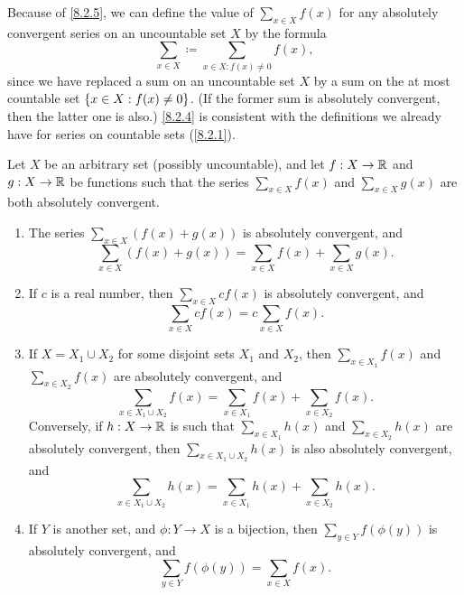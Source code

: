 \begin{note}
	Because of \cref{8.2.5}, we can define the value of \(\sum_{x \in X} f(x)\) for any absolutely convergent series on an uncountable set \(X\) by the formula
	\[
		\sum_{x \in X} \coloneqq \sum_{x \in X : f(x) \neq 0} f(x),
	\]
	since we have replaced a sum on an uncountable set \(X\) by a sum on the at most countable set \(\left\lbrace x \in X : f(x) \neq 0\right\rbrace\).
	(If the former sum is absolutely convergent, then the latter one is also.)
	\cref{8.2.4} is consistent with the definitions we already have for series on countable sets (\cref{8.2.1}).
\end{note}

\begin{prop}\label{8.2.6}
	Let \(X\) be an arbitrary set (possibly uncountable), and let \(f : X \to \mathbb{R}\) and \(g : X \to \mathbb{R}\) be functions such that the series \(\sum_{x \in X} f(x)\) and \(\sum_{x \in X} g(x)\) are both absolutely convergent.
	\begin{enumerate}
		\item The series \(\sum_{x \in X} (f(x) + g(x))\) is absolutely convergent, and
		      \[
			      \sum_{x \in X} (f(x) + g(x)) = \sum_{x \in X} f(x) + \sum_{x \in X} g(x).
		      \]
		\item If \(c\) is a real number, then \(\sum_{x \in X} cf(x)\) is absolutely convergent, and
		      \[
			      \sum_{x \in X} cf(x) = c \sum_{x \in X} f(x).
		      \]
		\item If \(X = X_1 \cup X_2\) for some disjoint sets \(X_1\) and \(X_2\), then \(\sum_{x \in X_1} f(x)\) and \\
		      \(\sum_{x \in X_2} f(x)\) are absolutely convergent, and
		      \[
			      \sum_{x \in X_1 \cup X_2} f(x) = \sum_{x \in X_1} f(x) + \sum_{x \in X_2} f(x).
		      \]
		      Conversely, if \(h : X \to \mathbb{R}\) is such that \(\sum_{x \in X_1} h(x)\) and \(\sum_{x \in X_2} h(x)\) are absolutely convergent, then \(\sum_{x \in X_1 \cup X_2} h(x)\) is also absolutely convergent, and
		      \[
			      \sum_{x \in X_1 \cup X_2} h(x) = \sum_{x \in X_1} h(x) + \sum_{x \in X_2} h(x).
		      \]
		\item If \(Y\) is another set, and \(\phi : Y \to X\) is a bijection, then \(\sum_{y \in Y} f(\phi(y))\) is absolutely convergent, and
		      \[
			      \sum_{y \in Y} f(\phi(y)) = \sum_{x \in X} f(x).
		      \]
	\end{enumerate}
\end{prop}

